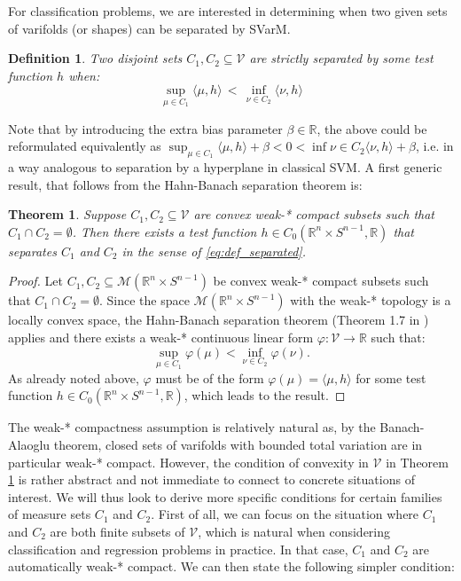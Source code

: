 \documentclass[11pt]{article}
\newtheorem{thm}{Theorem}
\newtheorem{definition}{Definition}
\newcommand{\R}{\mathbb{R}}
\begin{document}
For classification problems, we are interested in determining when two given sets of varifolds (or shapes) can be separated by SVarM. 
\begin{definition}
    Two disjoint sets $C_1,C_2 \subseteq \mathcal{V}$ are strictly separated by some test function $h$ when:
\begin{equation}
\label{eq:def_separated}
\sup_{\mu\in C_1} \langle \mu,h\rangle \,<\, \inf_{\nu\in C_2} \langle \nu,h\rangle
\end{equation} 
\end{definition}
Note that by introducing the extra bias parameter $\beta \in \R$, the above could be reformulated equivalently as $\sup_{\mu \in C_1} \langle \mu,h\rangle + \beta < 0 < \inf{\nu \in C_2}\langle \nu,h\rangle +\beta$, i.e. in a way analogous to separation by a hyperplane in classical SVM. A first generic result, that follows from the Hahn-Banach separation theorem is:  
\begin{thm}\label{thm:separating_convex}
    Suppose $C_1, C_2 \subseteq \mathcal{V}$ are convex weak-* compact subsets such that $C_1\cap C_2 = \emptyset$.
    Then there exists a test function $h\in C_0(\R^n\times S^{n-1},\R)$ that separates $C_1$ and $C_2$ in the sense of \eqref{eq:def_separated}. 
\end{thm}
\begin{proof}
Let $C_1, C_2 \subseteq \mathcal{M}(\R^n\times S^{n-1})$ be convex weak-* compact subsets such that $C_1\cap C_2 = \emptyset$. Since the space $\mathcal{M}(\R^n\times S^{n-1})$ with the weak-* topology is a locally convex space, the Hahn-Banach separation theorem (Theorem 1.7 in \cite{brezis2011functional}) applies and there exists a weak-* continuous linear form $\varphi: \mathcal{V} \rightarrow \R$ such that: 
\begin{equation*}
    \sup_{\mu\in C_1} \varphi(\mu)< \inf_{\nu\in C_2} \varphi(\nu).
\end{equation*}
As already noted above, $\varphi$ must be of the form $\varphi(\mu) = \langle \mu, h \rangle$ for some test function $h \in C_0(\R^n\times S^{n-1},\R)$, which leads to the result.
\end{proof}
The weak-* compactness assumption is relatively natural as, by the Banach-Alaoglu theorem, closed sets of varifolds with bounded total variation are in particular weak-* compact. However, the condition of convexity in $\mathcal{V}$ in Theorem \ref{thm:separating_convex} is rather abstract and not immediate to connect to concrete situations of interest. We will thus look to derive more specific conditions for certain families of measure sets $C_1$ and $C_2$. First of all, we can focus on the situation where $C_1$ and $C_2$ are both finite subsets of $\mathcal{V}$, which is natural when considering classification and regression problems in practice. In that case, $C_1$ and $C_2$ are automatically weak-* compact. We can then state the following simpler condition:
\end{document}
